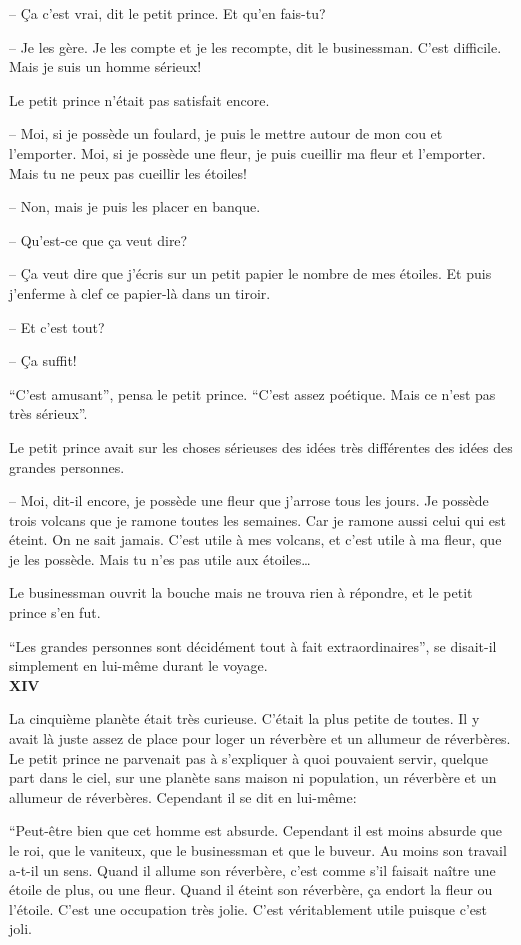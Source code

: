 \begin{Parallel}[p]{}{}
{-- Ça c'est vrai, dit le petit prince. Et qu'en fais-tu?

-- Je les gère. Je les compte et je les recompte, dit
le businessman. C'est difficile. Mais je suis un homme sérieux!

Le petit prince n'était pas satisfait encore.

-- Moi, si je possède un foulard, je puis le mettre
autour de mon cou et l'emporter. Moi, si je possède
une fleur, je puis cueillir ma fleur et l'emporter.
Mais tu ne peux pas cueillir les étoiles!

-- Non, mais je puis les placer en banque.

-- Qu'est-ce que ça veut dire?

-- Ça veut dire que j'écris sur un petit papier le
nombre de mes étoiles. Et puis j'enferme à clef ce
papier-là dans un tiroir.

-- Et c'est tout?

-- Ça suffit!

``C'est amusant'', pensa le petit prince. ``C'est assez
poétique. Mais ce n'est pas très sérieux''.

Le petit prince avait sur les choses sérieuses des idées très différentes des idées des grandes personnes.

-- Moi, dit-il encore, je possède une fleur que j'arrose tous les jours. Je possède trois volcans que je
ramone toutes les semaines. Car je ramone aussi
celui qui est éteint. On ne sait jamais. C'est utile à
mes volcans, et c'est utile à ma fleur, que je les possède. Mais tu n'es pas utile aux étoiles\ldots{}

Le businessman ouvrit la bouche mais ne trouva
rien à répondre, et le petit prince s'en fut.

``Les grandes personnes sont décidément tout à
fait extraordinaires'', se disait-il simplement en lui-même durant le voyage.\\

\textbf{XIV}

La cinquième planète était très curieuse. C'était la
plus petite de toutes. Il y avait là juste assez de place
pour loger un réverbère et un allumeur de réverbères. Le petit prince ne parvenait pas à s'expliquer à
quoi pouvaient servir, quelque part dans le ciel,
sur une planète sans maison ni population, un
réverbère et un allumeur de réverbères. Cependant
il se dit en lui-même:

``Peut-être bien que cet homme est absurde.
Cependant il est moins absurde que le roi, que le
vaniteux, que le businessman et que le buveur. Au
moins son travail a-t-il un sens. Quand il allume son
réverbère, c'est comme s'il faisait naître une étoile
de plus, ou une fleur. Quand il éteint son réverbère,
ça endort la fleur ou l'étoile. C'est une occupation très jolie. C'est véritablement utile puisque c'est
joli.

}
\end{Parallel}
